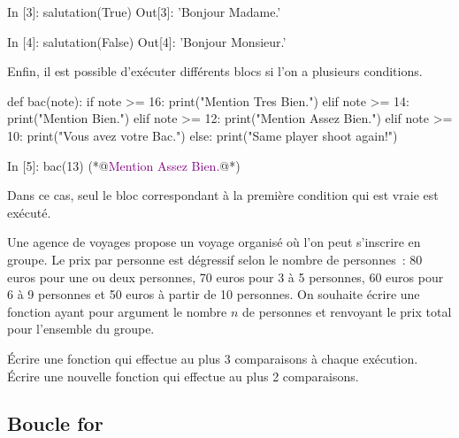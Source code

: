 \documentclass{magnolia}
\begin{document}
\begin{pythoncode}
In [3]: salutation(True)
Out[3]: 'Bonjour Madame.'

In [4]: salutation(False)
Out[4]: 'Bonjour Monsieur.'
\end{pythoncode}


Enfin, il est possible d'exécuter différents blocs si l'on a plusieurs conditions.

\begin{pythoncodeline}
def bac(note):
    if note >= 16:
        print("Mention Tres Bien.")
    elif note >= 14:
        print("Mention Bien.")
    elif note >= 12:
        print("Mention Assez Bien.")
    elif note >= 10:
        print("Vous avez votre Bac.")
    else:
        print("Same player shoot again!")
\end{pythoncodeline}

\begin{pythoncode}
In [5]: bac(13)
(*@\textcolor{purple}{Mention Assez Bien.}@*)
\end{pythoncode}

\noindent
Dans ce cas, seul le bloc correspondant à la première condition qui est vraie est exécuté. 

\begin{exoUnique}
\exo Une agence de voyages propose un voyage organisé où l'on peut s'inscrire en groupe.
Le prix par personne est dégressif selon le nombre de personnes~: 80 euros
pour une ou deux personnes, 70 euros pour 3 à 5 personnes, 60 euros pour 6 à 9 personnes et
50 euros à partir de 10 personnes. On souhaite écrire une fonction ayant pour argument le 
nombre $n$ de personnes et renvoyant le prix total pour l'ensemble du groupe.
\begin{questions}
\question Écrire une fonction qui effectue au plus 3 comparaisons à chaque exécution.
\question Écrire une nouvelle fonction qui effectue au plus 2 comparaisons.
\end{questions}
\end{exoUnique}

\subsection{Boucle for}
\end{document}
